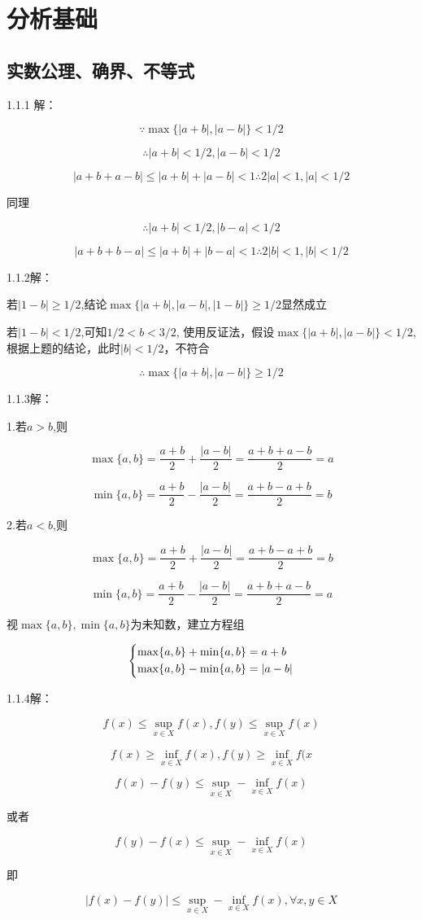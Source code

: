 \documentclass{ctexart}
\begin{document}
	\section{分析基础}
	\subsection{实数公理、确界、不等式}
	
	1.1.1 解：
	
	\[\because \max\{|a+b|, |a-b|\} < 1/2\]
	
	\[\therefore |a+b| < 1/2, |a-b| < 1/2\]
	
	\[|a+b+a-b| \leq |a+b|+|a-b|<1  \therefore 2|a| < 1, |a|<1/2\]
	
	同理
	
	\[\therefore |a+b| < 1/2, |b-a| < 1/2\]
	
	\[|a+b+b-a|\leq|a+b|+|b-a|<1  \therefore 2|b| < 1, |b|<1/2\]
	
	1.1.2解：
	
	若\(|1-b| \geq 1/2\),结论\(\max\{|a+b|, |a-b|, |1-b|\} \geq 1/2\)显然成立
	
	若\(|1-b| < 1/2\),可知\(1/2 < b < 3/2\), 使用反证法，假设\(\max\{|a+b|, |a-b|\} < 1/2\),根据上题的结论，此时\(|b|<1/2\)，不符合
	
	\[\therefore \max\{|a+b|, |a-b|\} \geq 1/2\]
	
	1.1.3解：
	
	1.若\(a > b\),则
	
	\[\max\{a,b\}=\frac{a+b}{2}+\frac{|a-b|}{2}=\frac{a+b+a-b}{2}=a\]
	
	\[\min\{a,b\}=\frac{a+b}{2}-\frac{|a-b|}{2}=\frac{a+b-a+b}{2}=b\]
	
	2.若\(a < b\),则
	
	\[\max\{a,b\}=\frac{a+b}{2}+\frac{|a-b|}{2}=\frac{a+b-a+b}{2}=b\]
	
	\[\min\{a,b\}=\frac{a+b}{2}-\frac{|a-b|}{2}=\frac{a+b+a-b}{2}=a\]
	
	视\(\max\{a,b\},\min\{a,b\}\)为未知数，建立方程组
	
	\[\begin{dcases}
	\max\{a,b\} + \min\{a,b\} = a+b \\
	\max\{a,b\} - \min\{a,b\} = |a-b|
	\end{dcases}\]
	
	1.1.4解：
	
	\[f(x) \leq \sup_{x \in X}f(x), f(y) \leq \sup_{x \in X}f(x)\]
	
	\[f(x) \geq \inf_{x \in X}f(x), f(y) \geq \inf_{x \in X}f(x\]
	
	\[f(x)-f(y) \leq \sup_{x \in X}-\inf_{x \in X}f(x)\]
	
	或者
	
	\[f(y)-f(x) \leq \sup_{x \in X}-\inf_{x \in X}f(x)\]
	
	即
	
	\[|f(x)-f(y)| \leq \sup_{x \in X}-\inf_{x \in X}f(x), \forall x,y \in X\]
	
	
	
	
	
	
	
	
	
	
	
	
	
\end{document}
